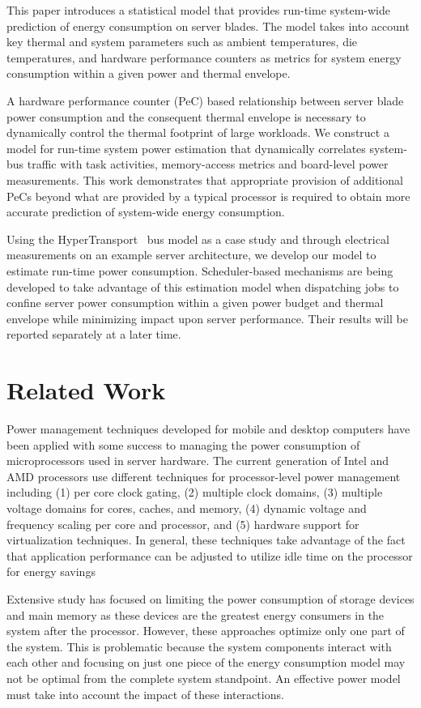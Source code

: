 \documentclass[times, 10pt, finalversion]{usetex-v1}
\begin{document}
This paper introduces a statistical model that provides run-time
system-wide prediction of energy consumption on server blades.  The
model takes into account key thermal and system parameters such as
ambient temperatures, die temperatures, and hardware performance counters
as metrics for system energy consumption within a given power and
thermal envelope. 

A hardware performance counter (PeC) based relationship between
server blade power consumption and the consequent thermal envelope is
necessary to dynamically control the thermal footprint of large
workloads.  We construct a model for run-time system power estimation
that dynamically correlates system-bus traffic with task activities,
memory-access metrics and board-level power measurements. This work
demonstrates that appropriate provision of additional PeCs beyond
what are provided by a typical processor is required to obtain more
accurate prediction of system-wide energy consumption.

Using the HyperTransport~\cite{HT2008} bus model as a case study and through
electrical measurements on an example server architecture, we develop
our model to estimate run-time power consumption.  Scheduler-based
mechanisms are being developed to take advantage of this estimation model
when dispatching jobs to confine server power consumption within a given power
budget and thermal envelope while minimizing impact upon server
performance. Their results will be reported separately at a later time.

\section{Related Work}
\label{sec:related}
Power management techniques developed for mobile and desktop computers
have been applied with some success to managing the power consumption of
microprocessors used in server hardware.  The current generation of
Intel and AMD processors use different techniques for processor-level
power management including (1) per core clock gating, (2) multiple clock
domains, (3) multiple voltage domains for cores, caches, and memory, (4)
dynamic voltage and frequency scaling per core and processor, and (5)
hardware support for virtualization techniques.  In general, these
techniques take advantage of the fact that application performance can
be adjusted to utilize idle time on the processor for energy
savings~\cite{Contreras2005}

Extensive study has focused on limiting the power consumption of
storage devices and main memory as these
devices are the greatest energy consumers in the system after the
processor.  However, these approaches optimize only one part of the
system.  This is problematic because the system components interact
with each other and focusing on just one piece of the energy consumption
model may not be optimal from the complete system standpoint.  An
effective power model must take into account the impact of these
interactions.
\end{document}
